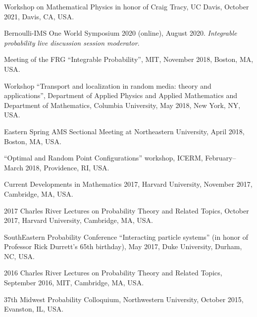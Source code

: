\documentclass[letterpaper,11pt]{article}
\begin{document}
\begin{etaremune}
	\item 
	Workshop on Mathematical Physics in honor of Craig Tracy, UC Davis, October 2021, Davis, CA, USA.
	\item 
	Bernoulli-IMS One World Symposium 2020 (online),
	August 2020.
	\emph{Integrable probability live discussion session moderator}.
	\item 
	Meeting of the FRG ``Integrable Probability'', MIT, November 2018, 
	Boston, MA, USA.
	\item 
		Workshop ``Transport and localization in random media: theory and applications'',
		Department of Applied Physics and Applied Mathematics and Department of Mathematics,
		Columbia University, 
		May 2018, 
		New York, NY, USA.
	\item 
		Eastern Spring AMS Sectional Meeting at Northeastern University,
	      April 2018, Boston, MA, USA.
	\item
		``Optimal and Random Point Configurations'' workshop, ICERM, February--March 2018, Providence, RI,
	      USA.
	\item 
		Current Developments in Mathematics 2017, Harvard University, November 2017, Cambridge, MA, USA.
	\item
	      2017 Charles River Lectures on Probability Theory and Related
	      Topics, October 2017, Harvard University, Cambridge, MA, USA.
	\item
	      SouthEastern Probability Conference ``Interacting particle
	      systems'' (in honor of Professor Rick Durrett's 65th birthday), May 2017, Duke
	      University, Durham, NC, USA.

	\item
	      2016 Charles River Lectures on Probability Theory and Related
	      Topics, September 2016, MIT, Cambridge, MA, USA.


	\item
	      37th Midwest Probability Colloquium, Northwestern University,
	      October 2015, Evanston, IL, USA.


\end{etaremune}
\end{document}
